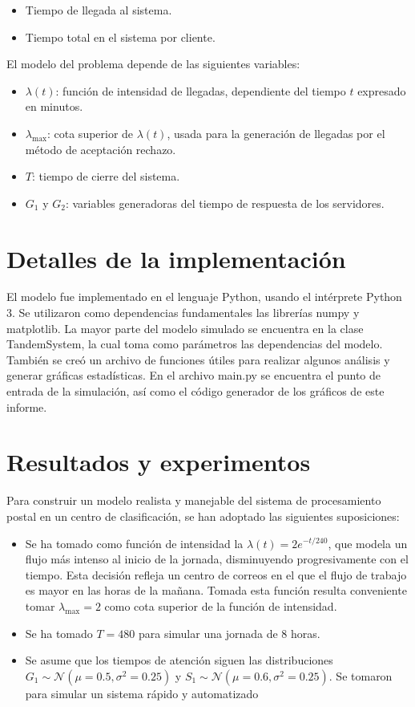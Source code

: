 \documentclass{article}
\begin{document}
\begin{itemize}
    \item Tiempo de llegada al sistema.
    \item Tiempo total en el sistema por cliente.
\end{itemize}

El modelo del problema depende de las siguientes variables:

\begin{itemize}
    \item $\lambda(t)$: función de intensidad de llegadas, dependiente del tiempo $t$ expresado en minutos.
    \item $\lambda_{\text{max}}$: cota superior de $\lambda(t)$, usada para la generación de llegadas por el método de aceptación rechazo.
    \item $T$: tiempo de cierre del sistema.
    \item $G_1$ y $G_2$: variables generadoras del tiempo de respuesta de los servidores.
\end{itemize}

\section{Detalles de la implementación}

El modelo fue implementado en el lenguaje Python, usando el intérprete Python 3. Se utilizaron como dependencias fundamentales las librerías numpy y matplotlib. La mayor parte del modelo simulado se encuentra en la clase TandemSystem, la cual toma como parámetros las dependencias del modelo. También se creó un archivo de funciones útiles para realizar algunos análisis y generar gráficas estadísticas. En el archivo main.py se encuentra el punto de entrada de la simulación, así como el código generador de los gráficos de este informe.

\section{Resultados y experimentos}

Para construir un modelo realista y manejable del sistema de procesamiento postal en un centro de clasificación, se han adoptado las siguientes suposiciones: 

\begin{itemize}
    \item Se ha tomado como función de intensidad la $\lambda(t) = 2e^{-t/240}$, que modela un flujo más intenso al inicio de la jornada, disminuyendo progresivamente con el tiempo. Esta decisión refleja un centro de correos en el que el flujo de trabajo es mayor en las horas de la mañana. Tomada esta función resulta conveniente tomar $\lambda_{\text{max}} = 2$ como cota superior de la función de intensidad.
    \item Se ha tomado $T = 480$ para simular una jornada de 8 horas.
    \item Se asume que los tiempos de atención siguen las distribuciones $G_1 \sim \mathcal{N}(\mu = 0.5, \sigma^2 = 0.25)$ y $S_1 \sim \mathcal{N}(\mu = 0.6, \sigma^2 = 0.25)$. Se tomaron para simular un sistema rápido y automatizado
\end{itemize}
\end{document}

